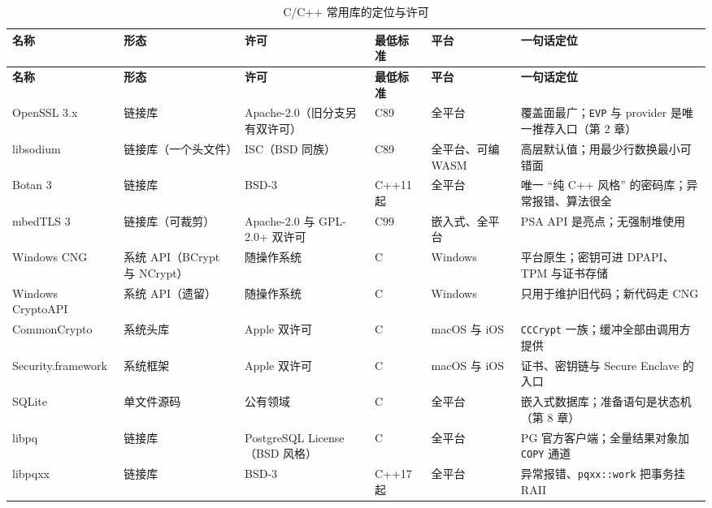\documentclass[12pt,a4paper,fontset=fandol]{ctexbook}
\newcommand{\cpp}[1]{C++#1}
\newcommand{\Tp}[1]{\texttt{#1}}
\newcommand{\CppJava}{C/C++}
\begin{document}
\begin{scriptsize}
\setlength{\tabcolsep}{3pt}
\begin{longtable}{@{}>{\raggedright\arraybackslash}p{}
                  >{\raggedright\arraybackslash}p{}
                  >{\raggedright\arraybackslash}p{}
                  >{\raggedright\arraybackslash}p{}
                  >{\raggedright\arraybackslash}p{}
                  >{\raggedright\arraybackslash}p{}@{}}
\caption{\CppJava{} 常用库的定位与许可}\\
\toprule
\textbf{名称} & \textbf{形态} & \textbf{许可} & \textbf{最低标准} &
\textbf{平台} & \textbf{一句话定位} \\
\midrule
\endfirsthead
\toprule
\textbf{名称} & \textbf{形态} & \textbf{许可} & \textbf{最低标准} &
\textbf{平台} & \textbf{一句话定位} \\
\midrule
\endhead
OpenSSL 3.x & 链接库 & Apache-2.0（旧分支另有双许可） & C89 &
全平台 & 覆盖面最广；\Tp{EVP} 与 provider 是唯一推荐入口（第 2 章） \\
libsodium & 链接库（一个头文件） & ISC（BSD 同族） & C89 &
全平台、可编 WASM & 高层默认值；用最少行数换最小可错面 \\
Botan 3 & 链接库 & BSD-3 & \cpp{11} 起 & 全平台 &
唯一 ``纯 C++ 风格'' 的密码库；异常报错、算法很全 \\
mbedTLS 3 & 链接库（可裁剪） & Apache-2.0 与 GPL-2.0+ 双许可 & C99 &
嵌入式、全平台 & PSA API 是亮点；无强制堆使用 \\
Windows CNG & 系统 API（BCrypt 与 NCrypt） & 随操作系统 & C &
Windows & 平台原生；密钥可进 DPAPI、TPM 与证书存储 \\
Windows CryptoAPI & 系统 API（遗留） & 随操作系统 & C & Windows &
只用于维护旧代码；新代码走 CNG \\
Common\allowbreak Crypto & 系统头库 & Apple 双许可 & C & macOS 与 iOS &
\Tp{CCCrypt} 一族；缓冲全部由调用方提供 \\
Security\allowbreak .framework & 系统框架 & Apple 双许可 & C &
macOS 与 iOS & 证书、密钥链与 Secure Enclave 的入口 \\
SQLite & 单文件源码 & 公有领域 & C & 全平台 &
嵌入式数据库；准备语句是状态机（第 8 章） \\
libpq & 链接库 & PostgreSQL License（BSD 风格） & C & 全平台 &
PG 官方客户端；全量结果对象加 \Tp{COPY} 通道 \\
libpqxx & 链接库 & BSD-3 & \cpp{17} 起 & 全平台 &
异常报错、\Tp{pqxx::work} 把事务挂 RAII \\

\end{longtable}
\end{scriptsize}
\end{document}
